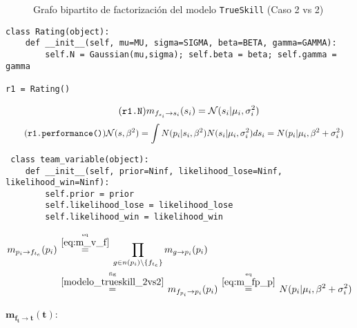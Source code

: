 \documentclass[article]{jss}
\newcommand{\N}{\mathcal{N}}
\newcommand\hfrac[2]{\genfrac{}{}{0pt}{}{#1}{#2}} %
\begin{document}
\begin{figure}[H]
  \centering
  \scalebox{.75}{}
  \caption{\small Grafo bipartito de factorizaci\'on del modelo \texttt{TrueSkill} (Caso 2 vs 2)}
  \label{modelo_trueskill_2vs2}
\end{figure}
%
\begin{lstlisting}
class Rating(object):
    def __init__(self, mu=MU, sigma=SIGMA, beta=BETA, gamma=GAMMA):
        self.N = Gaussian(mu,sigma); self.beta = beta; self.gamma = gamma

r1 = Rating()
\end{lstlisting}
%
\begin{equation}\label{eq:m_fs_s} \tag{\texttt{r1.N}}
\begin{split}
 m_{f_{s_i} \rightarrow s_i}(s_i) = \N(s_i| \mu_i, \sigma_i^2)
\end{split}
\end{equation}
%
\begin{equation}\label{eq:m_fp_p} \tag{\texttt{r1.performance()}}
\begin{split}
\N(s,\beta^2) & = \int N(p_i| s_i, \beta^2) N(s_i| \mu_i, \sigma_i^2) ds_i = N(p_i|\mu_i,\beta^2 + \sigma_i^2)
\end{split}
\end{equation}
%
\begin{lstlisting}
 class team_variable(object):
    def __init__(self, prior=Ninf, likelihood_lose=Ninf, likelihood_win=Ninf):
        self.prior = prior
        self.likelihood_lose = likelihood_lose
        self.likelihood_win = likelihood_win
\end{lstlisting}
%
\begin{equation}\label{eq:m_p_ft}
\begin{split}
 m_{p_i \rightarrow f_{t_e}}(p_i) & \overset{\hfrac{\text{eq}}{\ref{eq:m_v_f}}}{=} \prod_{g \in n(p_i) \setminus  \{f_{t_e} \}} m_{g \rightarrow p_i} (p_i) \\
 & \overset{\hfrac{\text{fig}}{\ref{modelo_trueskill_2vs2}}}{=} m_{f_{p_i} \rightarrow p_i}(p_i) \overset{\hfrac{\text{eq}}{\ref{eq:m_fp_p}}}{=} N(p_i|\mu_i,\beta^2 + \sigma_i^2)
\end{split}
\end{equation}

\paragraph{$\bm{m_{f_t \rightarrow t}(t)}:$}
\end{document}
